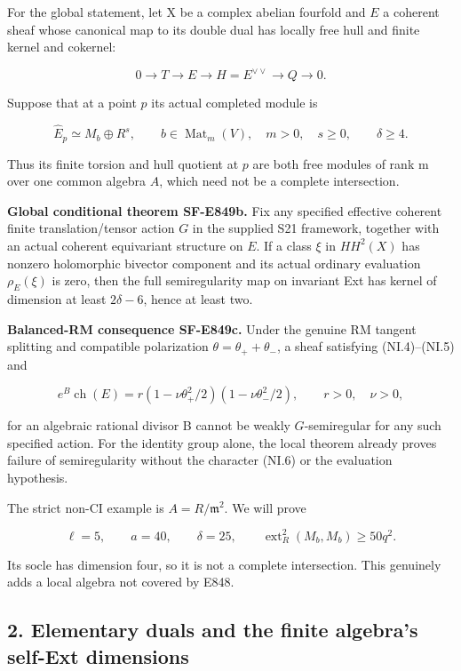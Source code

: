 For the global statement, let X be a complex abelian fourfold and \(E\)
a coherent sheaf whose canonical map to its double dual has locally
free hull and finite kernel and cokernel:

\[
 0\longrightarrow T\longrightarrow E\longrightarrow
 H=E^{\vee\vee}\longrightarrow Q\longrightarrow0.
 \tag{NI.4}
\]

Suppose that at a point \(p\) its actual completed module is

\[
 \widehat E_p\simeq M_b\oplus R^s,\qquad
 b\in\operatorname{Mat}_m(V),\quad m>0,\quad s\ge0,
 \qquad \delta\ge4.
 \tag{NI.5}
\]

Thus its finite torsion and hull quotient at \(p\) are both free modules
of rank m over one common algebra \(A\), which need not be a complete
intersection.

\textbf{Global conditional theorem SF-E849b.} Fix any specified effective
coherent finite translation/tensor action \(G\) in the supplied S21
framework, together with an actual coherent equivariant structure on \(E\).
If a class \(\xi\) in \(HH^2(X)\) has nonzero holomorphic bivector
component and its actual ordinary evaluation \(\rho_E(\xi)\) is zero,
then the full semiregularity map on invariant Ext has kernel of
dimension at least \(2\delta-6\), hence at least two.

\textbf{Balanced-RM consequence SF-E849c.} Under the genuine RM tangent
splitting and compatible polarization \(\theta=\theta_++\theta_-\), a sheaf
satisfying (NI.4)--(NI.5) and

\[
 e^B\operatorname{ch}(E)
   =r(1-\nu\theta_+^2/2)(1-\nu\theta_-^2/2),
 \qquad r>0,\quad\nu>0,
 \tag{NI.6}
\]

for an algebraic rational divisor B cannot be weakly \(G\)-semiregular
for any such specified action. For the identity group alone, the
local theorem already proves failure of semiregularity without the
character (NI.6) or the evaluation hypothesis.

The strict non-CI example is \(A=R/\mathfrak m^2\). We will prove

\[
       \ell=5,\qquad a=40,\qquad \delta=25,
       \qquad \operatorname{ext}^2_R(M_b,M_b)\ge50q^2.
 \tag{NI.7}
\]

Its socle has dimension four, so it is not a complete intersection.
This genuinely adds a local algebra not covered by E848.

\subsection{2. Elementary duals and the finite algebra's self-Ext dimensions}\label{SF-E849:s2}

